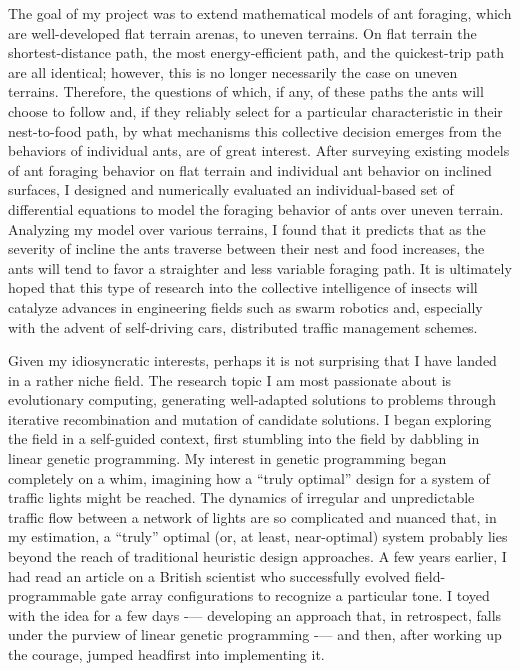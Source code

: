 \documentclass[12pt]{book}
\begin{document}
The goal of my project was to extend mathematical models of ant foraging, which are well-developed flat terrain arenas, to uneven terrains. On flat terrain the shortest-distance path, the most energy-efficient path, and the quickest-trip path are all identical; however, this is no longer necessarily the case on uneven terrains. Therefore, the questions of which, if any, of these paths the ants will choose to follow and, if they reliably select for a particular characteristic in their nest-to-food path, by what mechanisms this collective decision emerges from the behaviors of individual ants, are of great interest. After surveying existing models of ant foraging behavior on flat terrain and individual ant behavior on inclined surfaces, I designed and numerically evaluated an individual-based set of differential equations to model the foraging behavior of ants over uneven terrain. Analyzing my model over various terrains, I found that it predicts that as the severity of incline the ants traverse between their nest and food increases, the ants will tend to favor a straighter and less variable foraging path. It is ultimately hoped that this type of research into the collective intelligence of insects will catalyze advances in engineering fields such as swarm robotics and, especially with the advent of self-driving cars, distributed traffic management schemes.


Given my idiosyncratic interests, perhaps it is not surprising that I have landed in a rather niche field. The research topic I am most passionate about is evolutionary computing, generating well-adapted solutions to problems through iterative recombination and mutation of candidate solutions. I began exploring the field in a self-guided context, first stumbling into the field by dabbling in linear genetic programming. My interest in genetic programming began completely on a whim, imagining how a “truly optimal” design for a system of traffic lights might be reached. The dynamics of irregular and unpredictable traffic flow between a network of lights are so complicated and nuanced that, in my estimation, a “truly” optimal (or, at least, near-optimal) system probably lies beyond the reach of traditional heuristic design approaches. A few years earlier, I had read an article on a British scientist who successfully evolved field-programmable gate array configurations to recognize a particular tone. I toyed with the idea for a few days -— developing an approach that, in retrospect, falls under the purview of linear genetic programming -— and then, after working up the courage, jumped headfirst into implementing it. 
    
\end{document}
